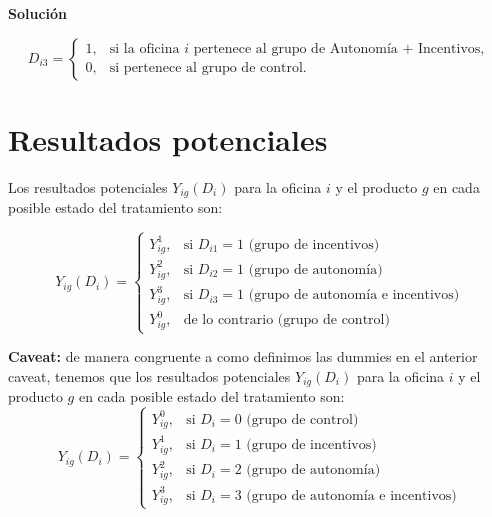 \documentclass[a4paper, answers, addpoints, 11pt]{exam}
\newenvironment{solucion}{%
  \begin{mdframed}[
    backgroundcolor=blue!5,    %
    linecolor=blue!50,          %
    linewidth=2pt,              %
    leftmargin=10pt,            %
    rightmargin=8pt,           %
    topline=true,              %
    bottomline=true,            %
    roundcorner=10pt,           %
    innerleftmargin=10pt,       %
    innerrightmargin=10pt,      %
    innerbottommargin=10pt,     %
    innertopmargin=10pt         %
  ]%
  \begin{tcolorbox}[colframe=blue!50!black, colback=blue!50, coltitle=white, sharp corners=all, boxrule=1mm, width=\textwidth, halign=left, valign=center, top=0mm, bottom=0mm, left=0mm, right=0mm] \textbf{Solución} \end{tcolorbox} }{\end{mdframed}}
\begin{document}
\begin{enumerate}
\begin{solucion}
\begin{mdframed}[backgroundcolor=moraditoClaro]
\begin{equation*}
D_{i3} =
\begin{cases}
    1, & \text{si la oficina } i \text{ pertenece al grupo de Autonomía + Incentivos}, \\
    0, & \text{si pertenece al grupo de control}.
\end{cases}
\end{equation*}
\end{mdframed}
  \section*{Resultados potenciales} 
Los resultados potenciales $Y_{ig}(D_i)$ para la oficina $i$ y el producto $g$ en cada posible estado del tratamiento son:

\begin{equation*}
    Y_{ig}(D_i) = \begin{cases}
        Y_{ig}^1, & \text{si $D_{i1} = 1$ (grupo de incentivos)} \\
        Y_{ig}^2, & \text{si $D_{i2} = 1$ (grupo de autonomía)} \\
        Y_{ig}^3, & \text{si $D_{i3} = 1$ (grupo de autonomía e incentivos)}\\
         Y_{ig}^0, & \text{de lo contrario (grupo de control)} 
    \end{cases}
\end{equation*}

\begin{mdframed}[backgroundcolor=moraditoClaro]
\textbf{Caveat:}   de manera congruente a como definimos las dummies en el anterior caveat, tenemos que los resultados potenciales $Y_{ig}(D_i)$ para la oficina $i$ y el producto $g$ en cada posible estado del tratamiento son:
\begin{equation*}
 Y_{ig}(D_i) = \begin{cases}
        Y_{ig}^0, & \text{si $D_i = 0$ (grupo de control)} \\
        Y_{ig}^1, & \text{si $D_i = 1$ (grupo de incentivos)} \\
        Y_{ig}^2, & \text{si $D_i = 2$ (grupo de autonomía)} \\
        Y_{ig}^3, & \text{si $D_i = 3$ (grupo de autonomía e incentivos)}
    \end{cases}
\end{equation*}
        \end{mdframed}
         \end{solucion}
   

\end{enumerate}
\end{document}
